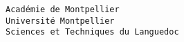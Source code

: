 \documentclass[french,a4paper]{report}
\begin{document}
\thispagestyle{empty}
\noindent
\begin{center}
\large{\texttt{Académie de Montpellier}}\\
\Large{\texttt{Université Montpellier }}\\
\large{\texttt{Sciences et Techniques du Languedoc}}\\
\end{center}
\vspace{1cm}
\end{document}
